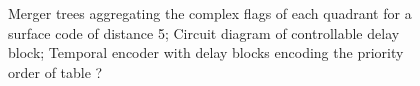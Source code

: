 \begin{figure}

\caption[]{
   Merger trees aggregating the complex flags of each quadrant for a surface code of distance 5;
 Circuit diagram of controllable delay block;
 Temporal encoder with delay blocks encoding the priority order of table ?}%
    \end{figure}
